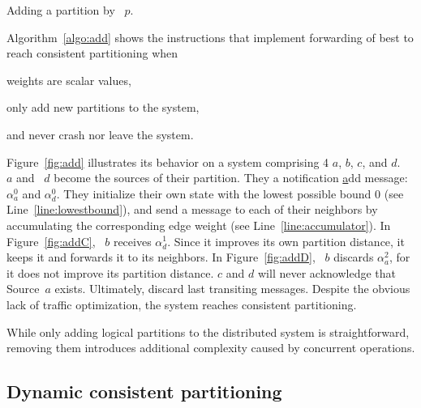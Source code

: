 \begin{algorithm}
  
  \caption{\label{algo:add}Adding a partition by \Process~$p$.}
\end{algorithm}

Algorithm~\ref{algo:add} shows the instructions that implement
forwarding of best to reach consistent partitioning when
\begin{inparaenum}[(i)]
\item weights are scalar values,
\item \processes only add new partitions to the system,
\item and \processes never crash nor leave the system.
\end{inparaenum} 
Figure~\ref{fig:add} illustrates its behavior on a system comprising 4
\processes $a$, $b$, $c$, and $d$. \Process~$a$ and \Process~$d$
become the sources of their partition. They \NAMEB a notification
\underline{a}dd message: $\alpha_a^0$ and $\alpha_d^0$. They
initialize their own state with the lowest possible bound $0$ (see
Line~\ref{line:lowestbound}), and send a message to each of their
neighbors by accumulating the corresponding edge weight (see
Line~\ref{line:accumulator}). In Figure~\ref{fig:addC}, \Process~$b$
receives $\alpha_{d}^{1}$. Since it improves its own partition
distance, it keeps it and forwards it to its neighbors. In
Figure~\ref{fig:addD}, \Process~$b$ discards $\alpha_{a}^{2}$, for it
does not improve its partition distance. \Processes $c$ and $d$ will
never acknowledge that Source~$a$ exists. Ultimately, \processes
discard last transiting messages. Despite the obvious lack of traffic
optimization, the system reaches consistent partitioning.

While only adding logical partitions to the distributed system is
straightforward, removing them introduces additional complexity caused
by concurrent operations.

\subsection{Dynamic consistent partitioning}
\label{subsec:dynamic}


